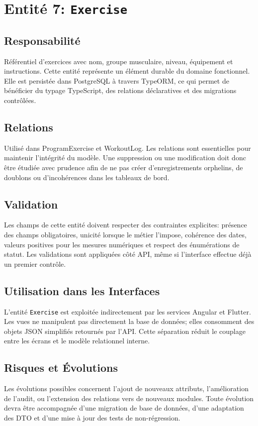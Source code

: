 \section{Entité 7: \texttt{Exercise}}
\subsection{Responsabilité}
Référentiel d’exercices avec nom, groupe musculaire, niveau, équipement et instructions. Cette entité représente un élément durable du domaine fonctionnel. Elle est persistée dans PostgreSQL à travers TypeORM, ce qui permet de bénéficier du typage TypeScript, des relations déclaratives et des migrations contrôlées.

\subsection{Relations}
Utilisé dans ProgramExercise et WorkoutLog. Les relations sont essentielles pour maintenir l'intégrité du modèle. Une suppression ou une modification doit donc être étudiée avec prudence afin de ne pas créer d'enregistrements orphelins, de doublons ou d'incohérences dans les tableaux de bord.

\subsection{Validation}
Les champs de cette entité doivent respecter des contraintes explicites: présence des champs obligatoires, unicité lorsque le métier l'impose, cohérence des dates, valeurs positives pour les mesures numériques et respect des énumérations de statut. Les validations sont appliquées côté API, même si l'interface effectue déjà un premier contrôle.

\subsection{Utilisation dans les Interfaces}
L'entité \texttt{Exercise} est exploitée indirectement par les services Angular et Flutter. Les vues ne manipulent pas directement la base de données; elles consomment des objets JSON simplifiés retournés par l'API. Cette séparation réduit le couplage entre les écrans et le modèle relationnel interne.

\subsection{Risques et Évolutions}
Les évolutions possibles concernent l'ajout de nouveaux attributs, l'amélioration de l'audit, ou l'extension des relations vers de nouveaux modules. Toute évolution devra être accompagnée d'une migration de base de données, d'une adaptation des DTO et d'une mise à jour des tests de non-régression.

